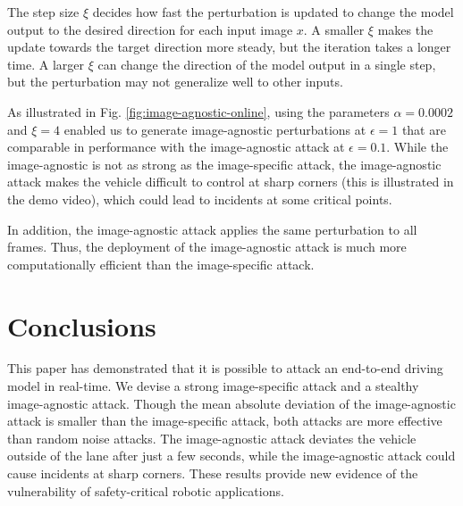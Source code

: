 The step size $\xi$ decides how fast the perturbation is updated to change the model output to the desired direction for each input image $x$. A smaller $\xi$ makes the update towards the target direction more steady, but the iteration takes a longer time. A larger $\xi$ can change the direction of the model output in a single step, but the perturbation may not generalize well to other inputs.

As illustrated in Fig. \ref{fig:image-agnostic-online}, using the parameters $\alpha=0.0002$ and $\xi=4$ enabled us to generate image-agnostic perturbations at $\epsilon=1$ that are comparable in performance with the image-agnostic attack at $\epsilon=0.1$. While the image-agnostic is not as strong as the image-specific attack, the image-agnostic attack makes the vehicle difficult to control at sharp corners (this is illustrated in the demo video), which could lead to incidents at some critical points. 

In addition, the image-agnostic attack applies the same perturbation to all frames. Thus, the deployment of the image-agnostic attack is much more computationally efficient than the image-specific attack.




\section{Conclusions}

This paper has demonstrated that it is possible to attack an end-to-end driving model in real-time. We devise a strong image-specific attack and a stealthy image-agnostic attack. Though the mean absolute deviation of the image-agnostic attack is smaller than the image-specific attack, both attacks are more effective than random noise attacks. The image-agnostic attack deviates the vehicle outside of the lane after just a few seconds, while the image-agnostic attack could cause incidents at sharp corners. These results provide new evidence of the vulnerability of safety-critical robotic applications.



